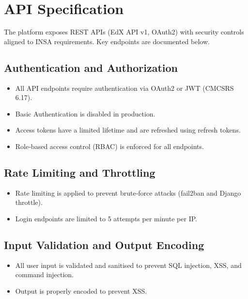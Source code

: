 \def\docTitle{Technical Design Document (TDD)}
\def\docVersion{3.1}
\def\docDate{July 19, 2026}








\tableofcontents
\newpage

\section{API Specification}
The platform exposes REST APIs (EdX API v1, OAuth2) with security controls aligned to INSA requirements. Key endpoints are documented below.

\subsection{Authentication and Authorization}
\begin{itemize}
    \item All API endpoints require authentication via OAuth2 or JWT (CMCSRS 6.17).
    \item Basic Authentication is disabled in production.
    \item Access tokens have a limited lifetime and are refreshed using refresh tokens.
    \item Role‑based access control (RBAC) is enforced for all endpoints.
\end{itemize}

\subsection{Rate Limiting and Throttling}
\begin{itemize}
    \item Rate limiting is applied to prevent brute‑force attacks (fail2ban and Django throttle).
    \item Login endpoints are limited to 5 attempts per minute per IP.
\end{itemize}

\subsection{Input Validation and Output Encoding}
\begin{itemize}
    \item All user input is validated and sanitised to prevent SQL injection, XSS, and command injection.
    \item Output is properly encoded to prevent XSS.
\end{itemize}

